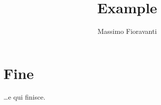 \documentclass{article}
\begin{document}
\author{Massimo Fioravanti}
\title{Example}
\maketitle
\tableofcontents

\section{Fine}
\dots e qui finisce.
\end{document}
